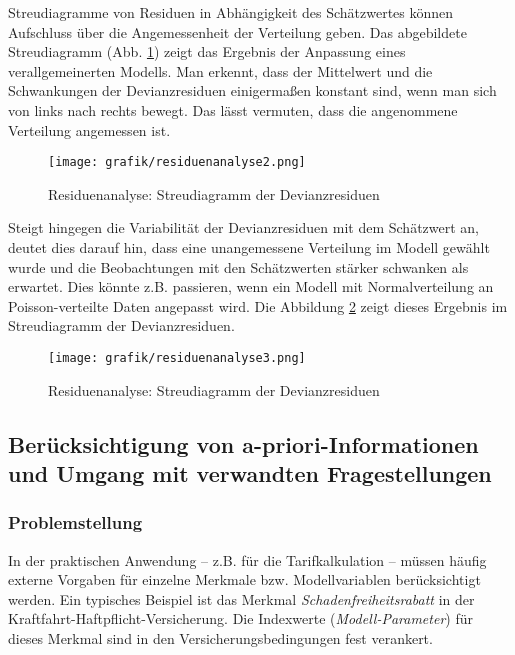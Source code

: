 Streudiagramme von Residuen in Abhängigkeit des Schätzwertes können Aufschluss über die Angemessenheit der Verteilung geben. Das abgebildete Streudiagramm (Abb. \ref{fig:residuenanalyse2}) zeigt das Ergebnis der Anpassung eines verallgemeinerten Modells. Man erkennt, dass der Mittelwert und die Schwankungen der Devianzresiduen einigermaßen konstant sind, wenn man sich von links nach rechts bewegt. Das lässt vermuten, dass die angenommene Verteilung angemessen ist.

\begin{figure}  %
	\centering
  \texttt{[image: grafik/residuenanalyse2.png]}
      \caption{Residuenanalyse: Streudiagramm der Devianzresiduen}
	\label{fig:residuenanalyse2}
	
\end{figure} 	 


Steigt hingegen die Variabilität der Devianzresiduen mit dem Schätzwert an, deutet dies darauf hin, dass eine unangemessene Verteilung im Modell gewählt wurde und die Beobachtungen mit den Schätzwerten stärker schwanken als erwartet. Dies könnte z.B. passieren, wenn ein Modell mit Normalverteilung an Poisson-verteilte Daten angepasst wird. Die Abbildung \ref{fig:residuenanalyse3} zeigt dieses Ergebnis im Streudiagramm der Devianzresiduen.
 
\begin{figure}  %
	\centering
  \texttt{[image: grafik/residuenanalyse3.png]}
      \caption{Residuenanalyse: Streudiagramm der Devianzresiduen}
	\label{fig:residuenanalyse3}
	
\end{figure} 	



\subsection{Berücksichtigung von a-priori-Informationen und Umgang mit verwandten Fragestellungen}  \label{subsection:a_priori_info}

\subsubsection{Problemstellung}

In der praktischen Anwendung – z.B. für die Tarifkalkulation – müssen häufig externe Vorgaben für einzelne Merkmale bzw. Modellvariablen berücksichtigt werden. Ein typisches Beispiel ist das Merkmal \textit{Schadenfreiheitsrabatt} in der Kraftfahrt-Haftpflicht-Versicherung. Die Indexwerte (\textit{Modell-Parameter}) für dieses Merkmal sind in den Versicherungsbedingungen fest verankert.

